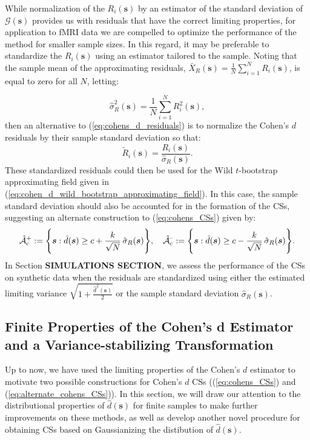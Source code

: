 While normalization of the $R_{i}(\bm{s})$ by an estimator of the standard deviation of $\mathcal{G}(\bm{s})$ provides us with residuals that have the correct limiting properties, for application to fMRI data we are compelled to optimize the performance of the method for smaller sample sizes. In this regard, it may be preferable to standardize the $R_i(\bm{s})$ using an estimator tailored to the sample. Noting that the sample mean of the approximating residuals, $\bar{X}_{R}(\bm{s}) = \frac{1}{N} \sum_{i=1}^{N} R_{i}(\bm{s})$, is equal to zero for all $N$, letting:  

\begin{equation}
\label{eq:sd_of_approximate_residuals}
\hat{\sigma}_{R}^{2}(\bm{s}) = \frac{1}{N} \sum_{i=1}^{N} R_{i}^{2}(\bm{s}),
\end{equation}
then an alternative to (\ref{eq:cohens_d_residuals}) is to normalize the Cohen's $d$ residuals by their sample standard deviation so that:
\begin{equation}
\label{eq:alternate_cohens_d_residuals}
\tilde{R}_{i}(\bm{s}) = \frac{R_{i}(\bm{s})}{\hat{\sigma}_{R}(\bm{s})}.
\end{equation}
These standardized residuals could then be used for the Wild $t$-bootstrap approximating field given in (\ref{eq:cohen_d_wild_bootstrap_approximating_field}). In this case, the sample standard deviation should also be accounted for in the formation of the CSs, suggesting an alternate construction to (\ref{eq:cohens_CSs}) given by:
\begin{equation}
\label{eq:alternate_cohens_CSs}
\operatorname{\hat{\mathcal{A}}_{c}^+} := \Bigg\{\bm{s} : \hat{d}(\bm{s}) \geq c + \frac{k}{\sqrt{N}}\, \hat{\sigma}_{R}(\bm{s}) \Bigg\}, \quad \operatorname{\hat{\mathcal{A}}_{c}^{\textrm{--}}} := \Bigg\{\bm{s} : \hat{d}(\bm{s}) \geq c - \frac{k}{\sqrt{N}} \,\hat{\sigma}_{R}(\bm{s}) \Bigg\}.
\end{equation}
In Section \textbf{SIMULATIONS SECTION}, we assess the performance of the CSs on synthetic data when the residuals are standardized using either the estimated limiting variance $\sqrt{1 + \frac{\hat{d}^{2}(\bm{s})}{2}}$ or the sample standard deviation $\hat{\sigma}_{R}(\bm{s})$.

\subsection{Finite Properties of the Cohen's d Estimator and a Variance-stabilizing Transformation}
\label{sec:normalizing_cohens_d}
Up to now, we have used the limiting properties of the Cohen's $d$ estimator to motivate two possible constructions for Cohen's $d$ CSs ((\ref{eq:cohens_CSs}) and (\ref{eq:alternate_cohens_CSs})). In this section, we will draw our attention to the distributional properties of $\hat{d}(\bm{s})$ for finite samples to make further improvements on these methods, as well as develop another novel procedure for obtaining CSs based on Gaussianizing the distibution of $\hat{d}(\bm{s})$. 

